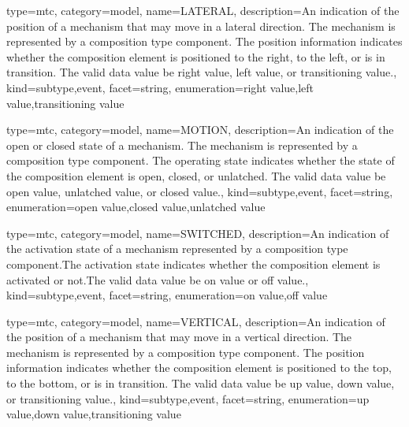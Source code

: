 {
  type=mtc,
  category=model,
  name={LATERAL},
  description={An indication of the position of a mechanism that may move in a lateral direction.   The mechanism is represented by a \gls{composition} type component. \newline The position information indicates whether the \gls{composition} element is positioned to the right, to the left, or is in transition.  \newline The \gls{valid data value} \must be \gls{right value}, \gls{left value}, or \gls{transitioning value}.},
  kind={subtype,event},
  facet={\gls{string}},
  enumeration={\gls{right value},\gls{left value},\gls{transitioning value}}
}


{
  type=mtc,
  category=model,
  name={MOTION},
  description={An indication of the open or closed state of a mechanism.   The mechanism is represented by a \gls{composition} type component. \newline The operating state indicates whether the state of the \gls{composition} element is open, closed, or unlatched.   \newline The \gls{valid data value} \must be \gls{open value}, \gls{unlatched value}, or \gls{closed value}.},
  kind={subtype,event},
  facet={\gls{string}},
  enumeration={\gls{open value},\gls{closed value},\gls{unlatched value}}
}


{
  type=mtc,
  category=model,
  name={SWITCHED},
  description={An indication of the activation state of a mechanism represented by a \gls{composition} type component.\newline The activation state indicates whether the \gls{composition} element is activated or not.\newline The \gls{valid data value} \must be \gls{on value} or \gls{off value}.},
  kind={subtype,event},
  facet={\gls{string}},
  enumeration={\gls{on value},\gls{off value}}
}


{
  type=mtc,
  category=model,
  name={VERTICAL},
  description={An indication of the position of a mechanism that may move in a vertical direction. The mechanism is represented by a \gls{composition} type component. \newline The position information indicates whether the \gls{composition} element is positioned to the top, to the bottom, or is in transition.  \newline The \gls{valid data value} \must be \gls{up value}, \gls{down value}, or \gls{transitioning value}.},
  kind={subtype,event},
  facet={\gls{string}},
  enumeration={\gls{up value},\gls{down value},\gls{transitioning value}}
}


